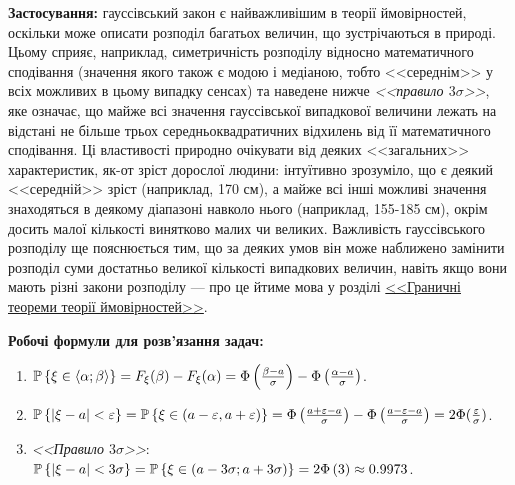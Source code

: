 \noindent\textbf{Застосування:} гауссівський закон є найважливішим в теорії ймовірностей,
оскільки може описати розподіл багатьох величин, що зустрічаються в природі.
Цьому сприяє, наприклад, симетричність розподілу відносно математичного
сподівання (значення якого також є модою і медіаною, тобто <<середнім>> у всіх можливих в цьому випадку сенсах) та наведене нижче \emph{<<правило $3\sigma$>>},
яке означає, що майже всі значення гауссівської випадкової величини
лежать на відстані не більше трьох середньоквадратичних 
відхилень від її математичного сподівання.
Ці властивості природно очікувати від деяких <<загальних>> характеристик, 
як-от зріст дорослої людини: інтуїтивно зрозуміло, що є деякий <<середній>> зріст (наприклад, 170 см),
а майже всі інші можливі значення знаходяться в деякому діапазоні навколо нього (наприклад, 155-185 см), окрім досить малої кількості
винятково малих чи великих. Важливість гауссівського розподілу ще пояснюється тим,
що за деяких умов він може наближено замінити розподіл суми достатньо великої кількості випадкових величин, 
навіть якщо вони мають різні закони розподілу --- про це йтиме мова у розділі \hyperref[ch:limit_theorems]{<<Граничні теореми теорії ймовірностей>>}.

\vspace{0.5em}
\noindent \textbf{Робочі формули для розв'язання задач:}
\begin{enumerate}
    \item $\P\left\{\xi \in \left<\alpha; \beta\right>\right\} 
    = F_\xi(\beta) - F_\xi(\alpha) = \Phi\left(\frac{\beta - a}{\sigma}\right)
    - \Phi\left(\frac{\alpha - a}{\sigma}\right)$.
    \item $\P\left\{\left| \xi - a \right| < \varepsilon\right\} = 
    \P\left\{\xi \in \left(a - \varepsilon, a + \varepsilon\right)\right\} = 
    \Phi\left(\frac{a + \varepsilon - a}{\sigma}\right)
    - \Phi\left(\frac{a - \varepsilon - a}{\sigma}\right) = 
    2\Phi(\frac{\varepsilon}{\sigma})$.
    \item \emph{<<Правило $3\sigma$>>}: 
    $\P\left\{\left| \xi - a \right| < 3\sigma\right\} = 
    \P\left\{\xi \in \left( a-3\sigma; a+3\sigma\right)\right\} = 2\Phi\left(3\right)
    \approx 0.9973$.
\end{enumerate}